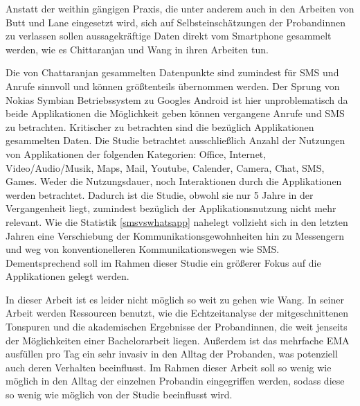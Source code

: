 Anstatt der weithin gängigen Praxis, die unter anderem auch in den Arbeiten von Butt \cite{butt2008personality} und Lane \cite{lane2011impact}
eingesetzt wird, sich auf Selbsteinschätzungen der Probandinnen zu verlassen sollen aussagekräftige Daten direkt vom Smartphone gesammelt werden, 
wie es Chittaranjan \cite{chittaranjan2011s} und Wang \cite{wang2014istudentlife} in ihren Arbeiten tun.
\par
Die von Chattaranjan gesammelten Datenpunkte sind zumindest für SMS und Anrufe sinnvoll und können größtenteils übernommen werden.
Der Sprung von Nokias Symbian Betriebssystem zu Googles Android ist hier unproblematisch da beide Applikationen die Möglichkeit geben können
vergangene Anrufe und SMS zu betrachten.
Kritischer zu betrachten sind die bezüglich Applikationen gesammelten Daten.
Die Studie betrachtet ausschließlich Anzahl der Nutzungen von Applikationen der folgenden Kategorien:
Office, Internet, Video/Audio/Musik, Maps, Mail, Youtube, Calender, Camera, Chat, SMS, Games.
Weder die Nutzungsdauer, noch Interaktionen durch die Applikationen werden betrachtet. 
Dadurch ist die Studie, obwohl sie nur 5 Jahre in der Vergangenheit liegt, zumindest bezüglich der Applikationsnutzung nicht mehr relevant.
Wie die Statistik \ref{smsvswhatsapp} nahelegt vollzieht sich in den letzten Jahren eine Verschiebung der Kommunikationsgewohnheiten hin zu Messengern und weg von konventionelleren Kommunikationswegen wie SMS.
Dementsprechend soll im Rahmen dieser Studie ein größerer Fokus auf die Applikationen gelegt werden.
\par
In dieser Arbeit ist es leider nicht möglich so weit zu gehen wie Wang.
In seiner Arbeit werden Ressourcen benutzt, wie die Echtzeitanalyse der mitgeschnittenen Tonspuren und die akademischen Ergebnisse der Probandinnen, die weit jenseits der Möglichkeiten einer Bachelorarbeit liegen.
Außerdem ist das mehrfache EMA ausfüllen pro Tag ein sehr invasiv in den Alltag der Probanden, was potenziell auch deren Verhalten beeinflusst.
Im Rahmen dieser Arbeit soll so wenig wie möglich in den Alltag der einzelnen Probandin eingegriffen werden, sodass diese so wenig wie möglich von der Studie beeinflusst wird.


